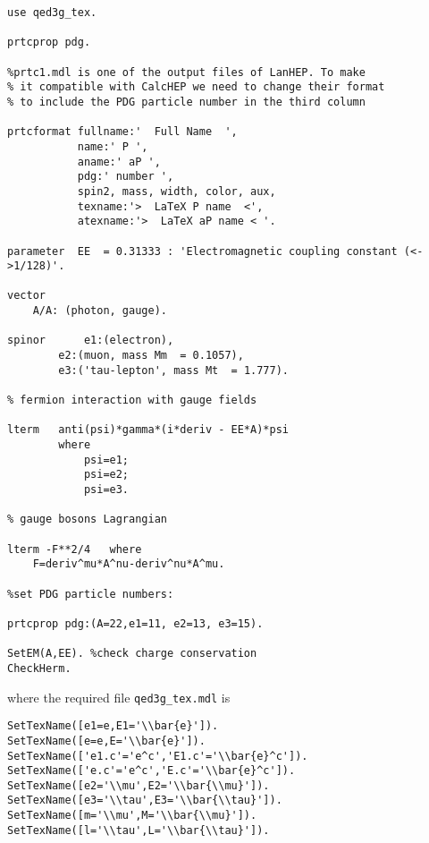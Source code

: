 \begin{frame}{}
\begin{lstlisting}
use qed3g_tex.

prtcprop pdg.

%prtc1.mdl is one of the output files of LanHEP. To make
% it compatible with CalcHEP we need to change their format
% to include the PDG particle number in the third column
 
prtcformat fullname:'  Full Name  ',
           name:' P ',
           aname:' aP ',
           pdg:' number ',
           spin2, mass, width, color, aux,
           texname:'>  LaTeX P name  <',
           atexname:'>  LaTeX aP name < '.

parameter  EE  = 0.31333 : 'Electromagnetic coupling constant (<->1/128)'.

vector  
	A/A: (photon, gauge).

spinor 		e1:(electron),
		e2:(muon, mass Mm  = 0.1057),
		e3:('tau-lepton', mass Mt  = 1.777).

% fermion interaction with gauge fields

lterm  	anti(psi)*gamma*(i*deriv - EE*A)*psi
		where 
			psi=e1;
			psi=e2;
			psi=e3.

% gauge bosons Lagrangian

lterm -F**2/4   where 
	F=deriv^mu*A^nu-deriv^nu*A^mu.

%set PDG particle numbers:

prtcprop pdg:(A=22,e1=11, e2=13, e3=15).

SetEM(A,EE). %check charge conservation
CheckHerm.
\end{lstlisting}
where the required file \lstinline{qed3g_tex.mdl} is
\begin{lstlisting}
SetTexName([e1=e,E1='\\bar{e}']).
SetTexName([e=e,E='\\bar{e}']).
SetTexName(['e1.c'='e^c','E1.c'='\\bar{e}^c']).
SetTexName(['e.c'='e^c','E.c'='\\bar{e}^c']).
SetTexName([e2='\\mu',E2='\\bar{\\mu}']).
SetTexName([e3='\\tau',E3='\\bar{\\tau}']).
SetTexName([m='\\mu',M='\\bar{\\mu}']).
SetTexName([l='\\tau',L='\\bar{\\tau}']).


\end{lstlisting}
\end{frame}
